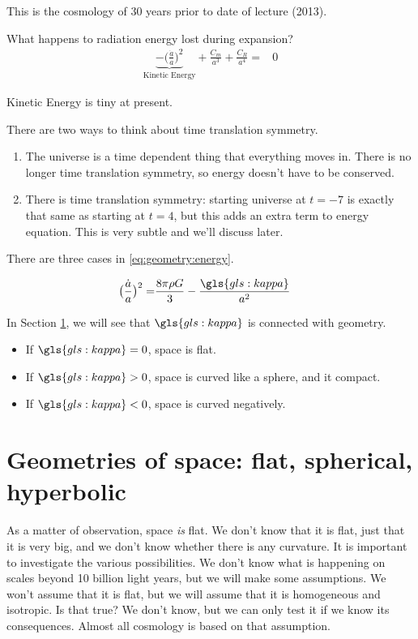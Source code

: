 \documentclass[]{article}
\begin{document}
This is the cosmology of 30 years prior to date of lecture (2013).

What happens to radiation energy lost during expansion?
\begin{align*}
	\underbrace{- \big(\frac{\dot{a}}{a}\big)^2}_\text{Kinetic Energy} + \frac{C_m}{a^3} +\frac{C_R}{a^4} =& 0 
\end{align*}

Kinetic Energy is  tiny at present.

There are two ways to think about time translation symmetry.
\begin{enumerate}
	\item The universe is a time dependent thing that everything moves in. There is no longer time translation symmetry, so energy doesn't have to be conserved.
	\item There is time translation symmetry: starting universe at $t=-7$ is exactly that same as starting at $t=4$, but this adds an extra term to energy equation. This is very subtle and we'll discuss later.
\end{enumerate}

There are three cases in \eqref{eq:geometry:energy}.

\begin{align*}
	\big(\frac{\dot{a}}{a}\big)^2  =& \frac{8\pi\rho G}{3} - \frac{\gls{gls:kappa}}{a^2} 
\end{align*}

In Section \ref{sec:geometries}, we will see that $\gls{gls:kappa}$ is connected with geometry.
\begin{itemize}
	\item If $\gls{gls:kappa}=0$, space is flat.
	\item If $\gls{gls:kappa}>0$, space is curved like a sphere, and it compact.
	\item If $\gls{gls:kappa}<0$, space is curved negatively.
\end{itemize}


\section{Geometries of space: flat, spherical, hyperbolic} \label{sec:geometries}

As a matter of observation, space \emph{is} flat. We don't know that it is flat, just that it is very big, and we don't know whether there is any curvature. It is important to investigate the various possibilities. We don't know what is happening on scales beyond 10 billion light years, but we will make some assumptions. We won't assume that it is flat, but we will assume that it is homogeneous and isotropic. Is that true? We don't know, but we can only test it if we know its consequences. Almost all cosmology is based on that assumption.
\end{document}
